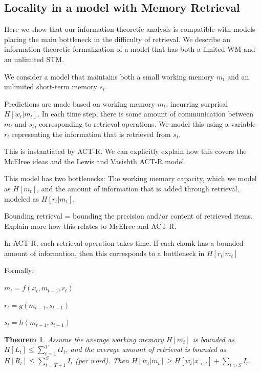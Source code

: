 \documentclass[11pt,letterpaper]{article}
\newcounter{theorem}
\newtheorem{thm}[theorem]{Theorem}
\begin{document}


\subsection{Locality in a model with Memory Retrieval}

Here we show that our information-theoretic analysis is compatible with models placing the main bottleneck in the difficulty of retrieval.
We describe an information-theoretic formalization of a model that has both a limited WM and an unlimited STM.

We consider a model that maintains both a small working memory $m_t$ and an unlimited short-term memory $s_t$.

Predictions are made based on working memory $m_t$, incurring surprisal $H[w_t|m_t]$.
In each time step, there is some amount of communication between $m_t$ and $s_t$, corresponding to retrieval operations.
We model this using a variable $r_t$ representing the information that is retrieved from $s_t$.

This is instantiated by ACT-R.
We can explicitly explain how this covers the McElree ideas and the Lewis and Vasishth ACT-R model.

This model has two bottlenecks:
The working memory capacity, which we model as $H[m_t]$, and the amount of information that is added through retrieval, modeled as $H[r_t|m_t]$.


Bounding retrieval = bounding the precision and/or content of retrieved items. Explain more how this relates to McElree and ACT-R.

In ACT-R, each retrieval operation takes time. If each chunk has a bounded amount of information, then this corresponds to a bottleneck in $H[r_t|m_t]$


Formally:

$m_t = f(x_t, m_{t-1}, r_t)$

$r_t = g(m_{t-1}, s_{t-1})$

$s_t = h(m_{t-1}, s_{t-1})$

\begin{thm}
Assume the average working memory $H[m_t]$ is bounded as $H[L_t] \leq \sum_{t=1}^T t I_t$, and the average amount of retrieval is bounded as $H[R_t] \leq \sum_{t=T+1}^S I_t$ (per word).
Then $H[w_t|m_t] \geq H[w_t|x_{<t}] + \sum_{t>S} I_t$.
\end{thm}
\end{document}
